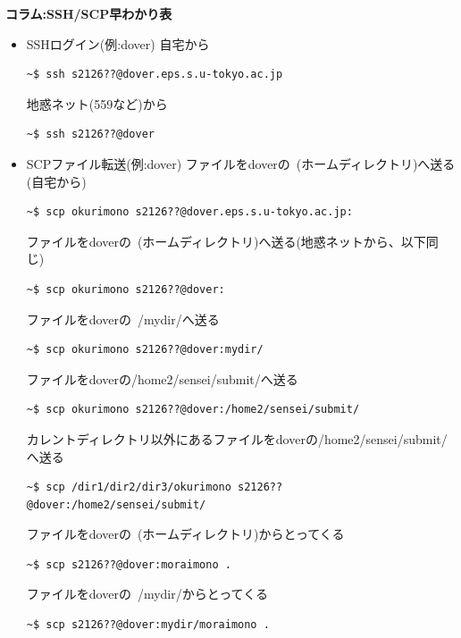 \documentclass[a4j]{ltjreport}
\begin{document}
    \begin{itembox}[l]{\textbf{コラム:SSH/SCP早わかり表}}
        \begin{itemize}
            \item SSHログイン(例:dover)
            自宅から
            \begin{lstlisting}[numbers=none]
    ~$ ssh s2126??@dover.eps.s.u-tokyo.ac.jp
            \end{lstlisting}
            地惑ネット(559など)から
            \begin{lstlisting}[numbers=none]
    ~$ ssh s2126??@dover
            \end{lstlisting}
            \item SCPファイル転送(例:dover)
            ファイルをdoverの~(ホームディレクトリ)へ送る(自宅から)
            \begin{lstlisting}[numbers=none]
    ~$ scp okurimono s2126??@dover.eps.s.u-tokyo.ac.jp:
            \end{lstlisting}
            ファイルをdoverの~(ホームディレクトリ)へ送る(地惑ネットから、以下同じ)
            \begin{lstlisting}[numbers=none]
    ~$ scp okurimono s2126??@dover:
            \end{lstlisting}
            ファイルをdoverの~/mydir/へ送る
            \begin{lstlisting}[numbers=none]
    ~$ scp okurimono s2126??@dover:mydir/
            \end{lstlisting}
            ファイルをdoverの/home2/sensei/submit/へ送る
            \begin{lstlisting}[numbers=none]
    ~$ scp okurimono s2126??@dover:/home2/sensei/submit/
            \end{lstlisting}
            カレントディレクトリ以外にあるファイルをdoverの/home2/sensei/submit/へ送る
            \begin{lstlisting}[numbers=none]
    ~$ scp /dir1/dir2/dir3/okurimono s2126??@dover:/home2/sensei/submit/
            \end{lstlisting}
            ファイルをdoverの~(ホームディレクトリ)からとってくる
            \begin{lstlisting}[numbers=none]
    ~$ scp s2126??@dover:moraimono .
            \end{lstlisting}
            ファイルをdoverの~/mydir/からとってくる
            \begin{lstlisting}[numbers=none]
    ~$ scp s2126??@dover:mydir/moraimono .
            \end{lstlisting}

\end{itemize}
\end{itembox}
\end{document}
